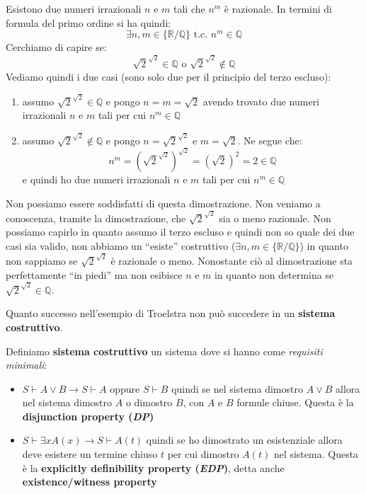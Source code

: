 \documentclass[a4paper,12pt, oneside]{book}
\begin{document}
\begin{esempio}
  Esistono due numeri irrazionali $n$ e $m$ tali che $n^m$ è razionale. In
  termini di formula del primo ordine si ha quindi:
  \[\exists n,m\in\{\mathbb{R}/\mathbb{Q}\}\mbox{ t.c. }n^m\in\mathbb{Q}\]
  Cerchiamo di capire se:
  \[\sqrt{2}^{\sqrt{2}}\in \mathbb{Q}\mbox{ o }\sqrt{2}^{\sqrt{2}}\not\in
    \mathbb{Q}\]
  Vediamo quindi i due casi (sono solo due per il principio del terzo escluso):
  \begin{enumerate}
    \item assumo $\sqrt{2}^{\sqrt{2}}\in \mathbb{Q}$ e pongo $n=m=\sqrt{2}$
    avendo trovato due numeri irrazionali $n$ e $m$ tali per cui
    $n^m\in\mathbb{Q}$ 
    \item assumo $\sqrt{2}^{\sqrt{2}}\not\in \mathbb{Q}$ e pongo
    $n=\sqrt{2}^{\sqrt{2}}$ e $m=\sqrt{2}$. Ne segue che:
    \[n^m=\left(\sqrt{2}^{\sqrt{2}}\right)^{\sqrt{2}}=(\sqrt{2})^2=2\in\mathbb{Q}\] 
    e quindi ho due numeri irrazionali $n$ e $m$ tali per cui $n^m\in\mathbb{Q}$
  \end{enumerate}
  Non possiamo essere soddisfatti di questa dimostrazione. Non veniamo a
  conoscenza, tramite la dimostrazione, che $\sqrt{2}^{\sqrt{2}}$ sia o meno
  razionale. Non possiamo capirlo in quanto assumo il terzo escluso e quindi non
  so quale dei due casi sia valido, non abbiamo un ``esiste'' costruttivo
  ($\exists n,m\in \{\mathbb{R}/\mathbb{Q}\}$) in quanto non sappiamo se
  $\sqrt{2}^{\sqrt{2}}$ è razionale o meno. Nonostante ciò al dimostrazione sta
  perfettamente ``in piedi'' ma non esibisce $n$ e $m$ in quanto non determina
  se $\sqrt{2}^{\sqrt{2}}\in\mathbb{Q}$.
\end{esempio}
Quanto successo nell'esempio di Troelstra non può succedere in un
\textbf{sistema costruttivo}.
\begin{definizione}
  Definiamo \textbf{sistema costruttivo} un sistema dove si hanno come
  \textit{requisiti minimali}: 
\begin{itemize}
  \item $S\vdash A\lor B\to S\vdash A\mbox{ oppure } S\vdash B$ quindi se
  nel sistema dimostro $A\lor B$ allora nel sistema dimostro $A$ o dimostro $B$,
  con $A$ e $B$ formule chiuse. Questa è la \textbf{disjunction property
    (\textit{DP})}  
  \item $S\vdash\exists xA(x)\to S\vdash A(t)$ quindi se ho dimostrato un
  esistenziale allora deve esistere un termine chiuso $t$ per cui dimostro
  $A(t)$ nel sistema. Questa è la \textbf{explicitly definibility property
    (\textit{EDP})}, detta anche \textbf{existence/witness property}
\end{itemize}
\end{definizione}
\end{document}
